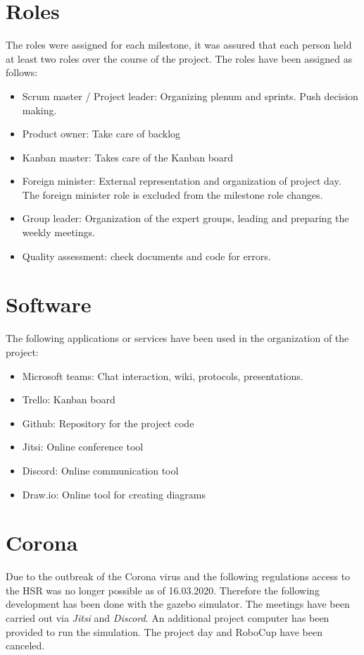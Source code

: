 \documentclass[main.tex]{subfiles}
\begin{document}
	\section{Roles}
	The roles were assigned for each milestone, it was assured that each person held at least two roles over the course of the project. The roles have been assigned as follows:
	\begin{itemize}
		\item Scrum master / Project leader: Organizing plenum and sprints. Push decision making.
		\item Product owner: Take care of backlog
		\item Kanban master: Takes care of the Kanban board
		\item Foreign minister: External representation and organization of project day. The foreign minister role is excluded from the milestone role changes.
		\item Group leader: Organization of the expert groups, leading and preparing the weekly meetings.
		\item Quality assessment: check documents and code for errors.
	\end{itemize}
	
	\section{Software}
	The following applications or services have been used in the organization of the project:
	\begin{itemize}
		\item Microsoft teams: Chat interaction, wiki, protocols, presentations.
		\item Trello: Kanban board
		\item Github: Repository for the project code
		\item Jitsi: Online conference tool
		\item Discord: Online communication tool
		\item Draw.io: Online tool for creating diagrams 
	\end{itemize}  

	\section{Corona}
	Due to the outbreak of the Corona virus and the following regulations access to the HSR was no longer possible as of 16.03.2020. Therefore the following development has been done with the gazebo simulator.
	The meetings have been carried out via \textit{Jitsi} and \textit{Discord}. An additional project computer has been provided to run the simulation.
	The project day and RoboCup have been canceled.
	
\end{document}
